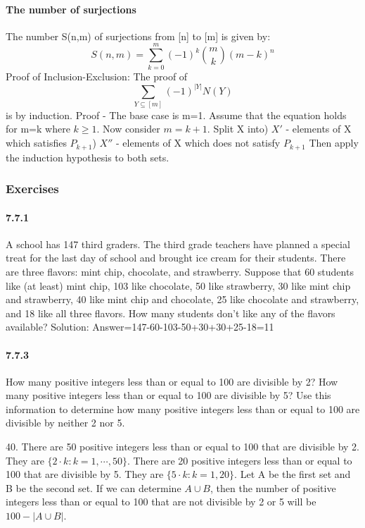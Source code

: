 \documentclass{article}
\begin{document}
\paragraph{The number of surjections}
The number S(n,m) of surjections from [n] to [m] is given by:$$S(n,m)=\sum_{k=0}^m(-1)^k\binom{m}{k}(m-k)^n$$
Proof of Inclusion-Exclusion:\newline
The proof of $$\sum_{Y\subseteq [m]}(-1)^{|Y|}N(Y)$$ is by induction.\newline
Proof - The base case is m=1.\newline
Assume that the equation holds for m=k where $k\ge 1$. Now
consider $m=k+1$.\newline
Split X into) $X'$ - elements of X which satisfies $P_{k+1}$) $X''$ - elements of X which does not satisfy $P_{k+1}$\newline
Then apply the induction hypothesis to both sets.
\subsubsection{Exercises}
\paragraph{7.7.1}
A school has 147 third graders. The third grade teachers have planned a special treat for the last day of school and brought ice cream for their students. There are three flavors: mint chip, chocolate, and strawberry. Suppose that 60 students like (at least) mint chip, 103 like chocolate, 50 like strawberry, 30 like mint chip and strawberry, 40 like mint chip and chocolate, 25 like chocolate and strawberry, and 18 like all three flavors. How many students don’t like any of the flavors available? \newline
Solution:\newline
Answer=147-60-103-50+30+30+25-18=11
\paragraph{7.7.3}
How many positive integers less than or equal to 100 are divisible by 2? How many
positive integers less than or equal to 100 are divisible by 5? Use this information to
determine how many positive integers less than or equal to 100 are divisible by neither
2 nor 5.\newline

40. There are 50 positive integers less than or equal to 100 that are divisible by 2. They
are $\{2 \cdot k : k = 1, \cdots , 50\}$. There are 20 positive integers less than or equal to 100 that are
divisible by 5. They are $\{5 \cdot k : k = 1,  20\}$. Let A be the first set and B be the second
set. If we can determine $A \cup B$, then the number of positive integers less than or equal to 100
that are not divisible by 2 or 5 will be $100 - |A \cup B|$.
\end{document}

